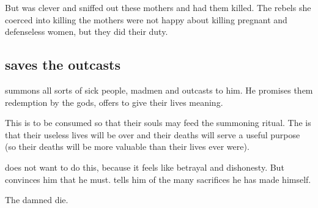 But \Vexstrasshin{} was clever and sniffed out these mothers and had them killed. 
The \nephilic{} rebels she coerced into killing the mothers were not happy about killing pregnant and defenseless women, but they did their duty. 









\subsection{\Thanatzil{} saves the outcasts}
\Thanatzil{} summons all sorts of sick people, madmen and outcasts to him. 
He promises them redemption by the \bane{} gods, offers to give their lives meaning. 

This  is to be consumed so that their souls may feed the summoning ritual. 
The  is that their useless lives will be over and their deaths will serve a useful purpose (so their deaths will be more valuable than their lives ever were). 

\Thanatzil{} does not want to do this, because it feels like betrayal and dishonesty. 
But \Semiza{} convinces him that he must. 
\Semiza{} tells him of the many sacrifices he has made himself. 


The damned die. 










